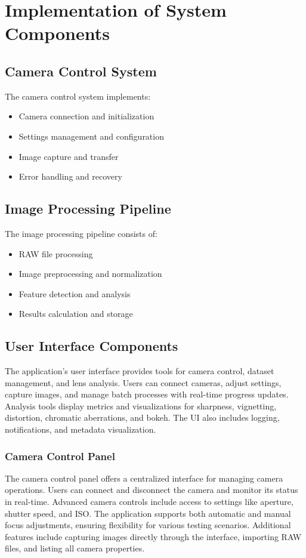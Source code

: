 \section{Implementation of System Components}

\subsection{Camera Control System}
The camera control system implements:

\begin{itemize}
    \item Camera connection and initialization
    \item Settings management and configuration
    \item Image capture and transfer
    \item Error handling and recovery
\end{itemize}

\subsection{Image Processing Pipeline}
The image processing pipeline consists of:

\begin{itemize}
    \item RAW file processing
    \item Image preprocessing and normalization
    \item Feature detection and analysis
    \item Results calculation and storage
\end{itemize}

\subsection{User Interface Components}
The application’s user interface provides tools for camera control, dataset management, and lens analysis. Users can connect cameras, adjust settings, capture images, and manage batch processes with real-time progress updates. Analysis tools display metrics and visualizations for sharpness, vignetting, distortion, chromatic aberrations, and bokeh. The UI also includes logging, notifications, and metadata visualization.

\subsubsection{Camera Control Panel}
The camera control panel offers a centralized interface for managing camera operations. Users can connect and disconnect the camera and monitor its status in real-time. Advanced camera controls include access to settings like aperture, shutter speed, and ISO. The application supports both automatic and manual focus adjustments, ensuring flexibility for various testing scenarios. Additional features include capturing images directly through the interface, importing RAW files, and listing all camera properties.

